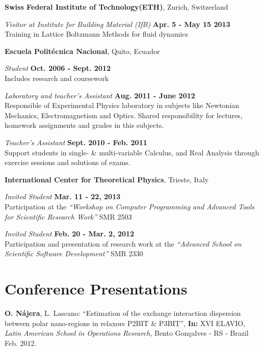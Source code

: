 \documentclass[margin,line]{res}
\newenvironment{list1}{
  \begin{list}{\ding{113}}{%
      \setlength{\itemsep}{0in}
      \setlength{\parsep}{0in} \setlength{\parskip}{0in}
      \setlength{\topsep}{0in} \setlength{\partopsep}{0in} 
      \setlength{\leftmargin}{0.17in}}}{\end{list}}
\begin{document}
\begin{resume}
  {\bf Swiss Federal Institute of Technology(ETH)}, Zurich, Switzerland
  \begin{list1}
    \item[] {\em Visitor at Institute for Building Material (IfB)} \hfill {\bf Apr. 5 - May 15 2013}\\
    Training in Lattice Boltzmann Methods for fluid dynamics
  \end{list1}

  {\bf Escuela Politécnica Nacional}, Quito, Ecuador
  \begin{list1}
   \item[] {\em Student} \hfill {\bf Oct. 2006 - Sept. 2012}\\
    Includes research and coursework\\
   \item[] {\em Laboratory and teacher's Assistant} \hfill {\bf Aug. 2011 - June 2012}\\
    Responsible of Experimental Physics laboratory in subjects
    like Newtonian Mechanics, Electromagnetism and Optics.
    Shared responsibility for lectures, homework assignments and grades in this subjects.\\
   \item[] {\em Teacher's Assistant} \hfill {\bf Sept. 2010 - Feb. 2011}\\
    Support students in single- \& multi-variable Calculus, and Real Analysis through
    exercise sessions and solutions of exams.
  \end{list1}

  {\bf International Center for Theoretical Physics}, Trieste, Italy
  \begin{list1}
    \item[] {\em Invited Student} \hfill {\bf Mar. 11 - 22, 2013} \\
    Participation at the {\em ``Workshop on Computer Programming and Advanced Tools for Scientific
    Research Work''} SMR 2503
    \item[] {\em Invited Student} \hfill {\bf Feb. 20 - Mar. 2, 2012} \\
    Participation and presentation of research work at the {\em ``Advanced School on Scientific
    Software Development''} SMR 2330
  \end{list1}

\section{\sc Conference Presentations}
  {\bf O. Nájera}, L. Lascano: ``Estimation of the exchange interaction dispersion between polar
  nano-regions in relaxors P2BIT \& P3BIT'', {\bf In:} XVI ELAVIO, {\em Latin American School in Operations Research}, Bento Gonçalves - RS - Brazil Feb. 2012.


\end{resume}
\end{document}
